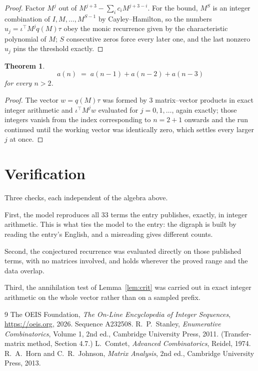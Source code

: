 \documentclass[11pt,a4paper]{article}
\theoremstyle{plain}
\newtheorem{theorem}{Theorem}
\theoremstyle{definition}
\begin{document}
\begin{proof}
Factor $M^{j}$ out of $M^{j+3}-\sum_ic_iM^{j+3-i}$. For the bound, $M^{S}$
is an integer combination of $I,M,\dots,M^{S-1}$ by Cayley--Hamilton, so the numbers
$u_j=\iota^{\!\top}M^{j}q(M)\tau$ obey the monic recurrence given by the characteristic
polynomial of $M$; $S$ consecutive zeros force every later one, and the last nonzero $u_j$
pins the threshold exactly.
\end{proof}

\begin{theorem}
\[
a(n)\;=\;a(n-1) + a(n-2) + a(n-3)
\]
for every $n>2$.
\end{theorem}

\begin{proof}
The vector $w=q(M)\tau$ was formed by $3$ matrix--vector products in exact integer
arithmetic and $\iota^{\!\top}M^{j}w$ evaluated for $j=0,1,\dots$, again exactly; those
integers vanish from the index corresponding to $n=2+1$ onwards and the run continued
until the working vector was identically zero, which settles every larger $j$ at once.
\end{proof}

\section{Verification}

Three checks, each independent of the algebra above.

First, the model reproduces all $33$ terms the entry publishes, exactly, in integer
arithmetic. This is what ties the model to the entry: the digraph is built by reading the
entry's English, and a misreading gives different counts.

Second, the conjectured recurrence was evaluated directly on those published terms, with no
matrices involved, and holds wherever the proved range and the data overlap.

Third, the annihilation test of Lemma~\ref{lem:crit} was carried out in exact integer
arithmetic on the whole vector rather than on a sampled prefix.

\begin{thebibliography}{9}
 The OEIS Foundation, \emph{The On-Line Encyclopedia of Integer
Sequences}, \url{https://oeis.org}, 2026. Sequence A232508.
 R.~P.~Stanley, \emph{Enumerative Combinatorics}, Volume 1, 2nd ed.,
Cambridge University Press, 2011. (Transfer-matrix method, Section 4.7.)
 L.~Comtet, \emph{Advanced Combinatorics}, Reidel, 1974.
 R.~A.~Horn and C.~R.~Johnson, \emph{Matrix Analysis}, 2nd ed., Cambridge
University Press, 2013.
\end{thebibliography}
\end{document}
